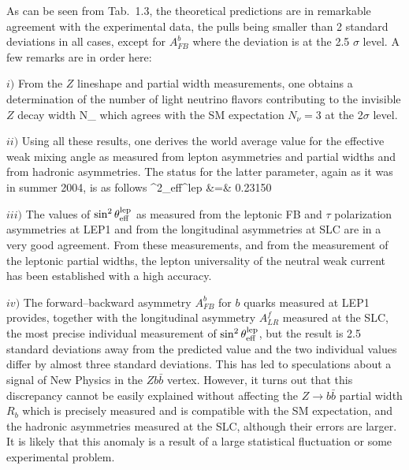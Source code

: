 As can be seen from Tab.~1.3, the theoretical predictions are in remarkable
agreement with the experimental data, the pulls being smaller than 2
standard deviations in all cases, except for $A_{FB}^b$ where the deviation is
at the 2.5 $\sigma$ level. A few remarks are in order here: \s

\begin{table}[tp]
\begin{center}
\end{center}
\vspace*{-27mm}
\vspace*{-3mm}
\end{table}


$i)$ From the $Z$ lineshape and partial width measurements, one obtains a 
determination of the number of light neutrino flavors contributing to the 
invisible $Z$ decay width   
\beq 
N_ 
\eeq
which agrees with the SM expectation $N_\nu=3$ at the 2$\sigma$ level. \s
 
$ii)$ Using all these results, one derives the world average value for the 
effective weak mixing angle as measured from lepton asymmetries and partial 
widths and from hadronic asymmetries. The  status for the latter parameter, 
again as it was in summer 2004, is as follows \cite{High-Precision}
\beq
\sin^2\theta_{\rm eff}^{\rm lep} &=& 0.23150  
\label{sineff_average}
\eeq

$iii)$ The values of $\sin^2\theta_{\rm eff}^{\rm lep}$ as measured from the
leptonic FB and $\tau$ polarization asymmetries at LEP1 and from the 
longitudinal
asymmetries at SLC are in a very good agreement. From these measurements, and 
from the measurement of the leptonic partial widths, the lepton universality of
the neutral weak current has been established with a high accuracy.\s

$iv)$ The forward--backward asymmetry $A_{FB}^b$ for $b$ quarks measured at 
LEP1 provides,
together with the longitudinal asymmetry $A_{LR}^f$ measured at the SLC, the
most precise individual measurement of $\sin^2\theta^{\rm lep}_{\rm eff}$, but
the result is 2.5 standard deviations away from the predicted value and the two
individual values differ by almost three standard deviations. This has led to
speculations about a signal of New Physics in the $Zb\bar b$ vertex.  However,
it turns out that this discrepancy cannot be easily explained without affecting
the $Z\to b\bar{b}$ partial width $R_b$ which is precisely measured and is
compatible with the SM expectation, and the hadronic asymmetries measured at
the SLC, although their errors are larger. It is likely that this anomaly
is a result of a large statistical fluctuation or some experimental problem.\s 


